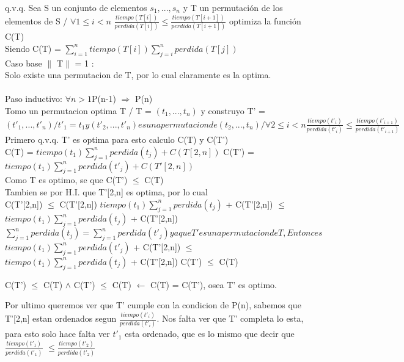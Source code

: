 q.v.q. Sea S un conjunto de elementos  ${s_1,...,s_n}$ y T un permutación de los elementos de S / $\forall 1 \leq i  < n$ $\frac{tiempo(T[i])}{perdida(T[i])} \leq \frac{tiempo(T[i+1])}{perdida(T[i+1])} $ optimiza la función C(T) 
\\
Siendo C(T) = $\sum_{i=1}^{n} tiempo(T[i]) \sum_{j=i}^{n}perdida(T[j]) $
\\
Caso base $\|$ T$\|$ = 1 :
\\
Solo existe una permutacion de T, por lo cual claramente es la optima.
\\
\\
Paso inductivo:
$\forall n > 1$P(n-1) $\Rightarrow$ P(n)
\\
Tomo un permutacion optima T / T = $(t_1,...,t_n)$ y construyo T' = $(t'_1,...,t'_n) / t'_1 = t_1 y (t'_2,...,t'_n) es una permutacion de (t_2,...,t_n) / \forall 2 \leq i  < n \frac{tiempo(t'_i)}{perdida(t'_i)} \leq \frac{tiempo(t'_{i+1})}{perdida(t'_{i+1})} $
\\
Primero q.v.q. T' es optima para esto calculo C(T) y C(T')
\\
C(T) = $tiempo(t_1) \sum_{j=1}^{n}perdida(t_j) + C(T[2,n]) $
C(T') = $tiempo(t_1) \sum_{j=1}^{n}perdida(t'_j) + C(T'[2,n]) $
\\
Como T es optimo, se que C(T') $\leq$ C(T)
\\
Tambien se por H.I. que T'[2,n] es optima, por lo cual 
\\
C(T'[2,n]) $\leq$ C(T'[2,n])
$tiempo(t_1) \sum_{j=1}^{n}perdida(t_j)$ + C(T'[2,n]) $\leq$  $tiempo(t_1) \sum_{j=1}^{n}perdida(t_j)$ + C(T'[2,n])
$\sum_{j=1}^{n}perdida(t_j) = \sum_{j=1}^{n}perdida(t'_j) ya que T' es una permutacion de T, Entonces$
$tiempo(t_1) \sum_{j=1}^{n}perdida(t'_j)$ + C(T'[2,n]) $\leq$  $tiempo(t_1) \sum_{j=1}^{n}perdida(t_j)$ + C(T'[2,n])
C(T') $\leq$ C(T)

C(T') $\leq$ C(T) $\wedge$ C(T') $\leq$ C(T) $\leftarrow$ C(T) = C(T'), osea T' es optimo.

Por ultimo queremos ver que T' cumple con la condicion de P(n), sabemos que T'[2,n] estan ordenados segun $\frac{tiempo(t'_i)}{perdida(t'_i)}$. Nos falta ver que T' completa lo esta, para esto solo hace falta ver $t'_1$ esta ordenado, que es lo mismo que decir que $\frac{tiempo(t'_1)}{perdida(t'_1)}$ $\leq \frac{tiempo(t'_2)}{perdida(t'_2)}$

